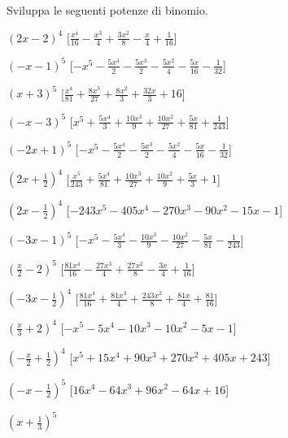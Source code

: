 \begin{esercizio}
 \label{ese:11.29}
 Sviluppa le seguenti potenze di binomio.
 \begin{enumeratea}
 \spazielenx
\item \(\left(2 x - 2\right)^{4}\)
  \hfill [\(\frac{x^{4}}{16} - \frac{x^{3}}{4} + \frac{3 x^{2}}{8} - 
\frac{x}{4} + \frac{1}{16}\)]
\item \(\left(- x - 1\right)^{5}\)
  \hfill [\(- x^{5} - \frac{5 x^{4}}{2} - \frac{5 x^{3}}{2} - \frac{5 
x^{2}}{4} - \frac{5 x}{16} - \frac{1}{32}\)]
\item \(\left(x + 3\right)^{5}\)
  \hfill [\(\frac{x^{4}}{81} + \frac{8 x^{3}}{27} + \frac{8 x^{2}}{3} + 
\frac{32 x}{3} + 16\)]
\item \(\left(- x - 3\right)^{5}\)
  \hfill [\(x^{5} + \frac{5 x^{4}}{3} + \frac{10 x^{3}}{9} + \frac{10 
x^{2}}{27} + \frac{5 x}{81} + \frac{1}{243}\)]
\item \(\left(- 2 x + 1\right)^{5}\)
  \hfill [\(- x^{5} - \frac{5 x^{4}}{2} - \frac{5 x^{3}}{2} - \frac{5 
x^{2}}{4} - \frac{5 x}{16} - \frac{1}{32}\)]
\item \(\left(2 x + \frac{1}{2}\right)^{4}\)
  \hfill [\(\frac{x^{5}}{243} + \frac{5 x^{4}}{81} + \frac{10 x^{3}}{27} + 
\frac{10 x^{2}}{9} + \frac{5 x}{3} + 1\)]
\item \(\left(2 x - \frac{1}{2}\right)^{4}\)
  \hfill [\(- 243 x^{5} - 405 x^{4} - 270 x^{3} - 90 x^{2} - 15 x - 1\)]
\item \(\left(- 3 x - 1\right)^{5}\)
  \hfill [\(- x^{5} - \frac{5 x^{4}}{3} - \frac{10 x^{3}}{9} - \frac{10 
x^{2}}{27} - \frac{5 x}{81} - \frac{1}{243}\)]
\item \(\left(\frac{x}{2} - 2\right)^{5}\)
  \hfill [\(\frac{81 x^{4}}{16} - \frac{27 x^{3}}{4} + \frac{27 x^{2}}{8} - 
\frac{3 x}{4} + \frac{1}{16}\)]
\item \(\left(- 3 x - \frac{1}{2}\right)^{4}\)
  \hfill [\(\frac{81 x^{4}}{16} + \frac{81 x^{3}}{4} + \frac{243 x^{2}}{8} 
+ \frac{81 x}{4} + \frac{81}{16}\)]
\item \(\left(\frac{x}{3} + 2\right)^{4}\)
  \hfill [\(- x^{5} - 5 x^{4} - 10 x^{3} - 10 x^{2} - 5 x - 1\)]
\item \(\left(- \frac{x}{2} + \frac{1}{2}\right)^{4}\)
  \hfill [\(x^{5} + 15 x^{4} + 90 x^{3} + 270 x^{2} + 405 x + 243\)]
\item \(\left(- x - \frac{1}{2}\right)^{5}\)
  \hfill [\(16 x^{4} - 64 x^{3} + 96 x^{2} - 64 x + 16\)]
\item \(\left(x + \frac{1}{3}\right)^{5}\)

\end{enumeratea}
\end{esercizio}
